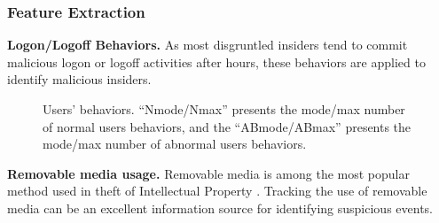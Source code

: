 \documentclass[conference]{IEEEtran}
\begin{document}
\subsubsection{Feature Extraction}


\textbf{Logon/Logoff Behaviors.} 
As most disgruntled insiders tend to
commit malicious logon or logoff activities after hours,  these behaviors are applied to identify malicious insiders.



\begin{figure}[!t]
\centering
{} 
\caption{  Users' behaviors. 
``Nmode/Nmax'' presents the mode/max number of normal users behaviors, and
the ``ABmode/ABmax'' presents the mode/max number of abnormal users
behaviors. }
\label{fig4}
\end{figure}

\noindent \textbf{Removable media usage.}
Removable media is among the most popular method used in theft of Intellectual Property  \cite{b18}. Tracking the use of removable media can be an excellent information source for identifying suspicious events.
\end{document}
